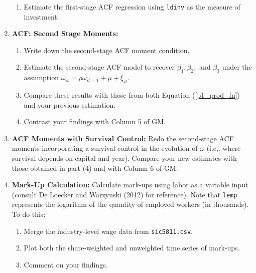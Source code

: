 \documentclass{article}
\begin{document}
\begin{enumerate}
\begin{enumerate}
\item Estimate the first-stage ACF regression using \texttt{ldinv} as the measure of investment.



\end{enumerate}

\item \textbf{ACF: Second Stage Moments:}

\begin{enumerate}
\item Write down the second-stage ACF moment condition.



\item Estimate the second-stage ACF model to recover $\beta_1, \beta_2,$ and $\beta_3$ under the assumption $\omega_{it} = \rho \omega_{i t-1} + \mu + \xi_{it}.$


\item Compare these results with those from both Equation (\ref{p1_prod_fn}) and your previous
estimation.


\item Contrast your findings with Column 5 of GM.

\end{enumerate}


\item \textbf{ACF Moments with Survival Control:}
Redo the second-stage ACF moments incorporating a survival control in the evolution of $\omega$ (i.e,. where survival depends on capital and year). Compare your new estimates with those obtained in part (4) and with Column 6 of GM.



\item \textbf{Mark-Up Calculation:}
Calculate mark-ups using labor as a variable input (consult De Loecker and Warzynski (2012) for reference). Note that \texttt{lemp} represents the logarithm of the quantity
of employed workers (in thousands). To do this:
\begin{enumerate}
\item Merge the industry-level wage data from \texttt{sic5811.csv}.


\item Plot both the share-weighted and unweighted time series of mark-ups. 


\item Comment on your findings. 
\end{enumerate}


\end{enumerate}
\end{document}
